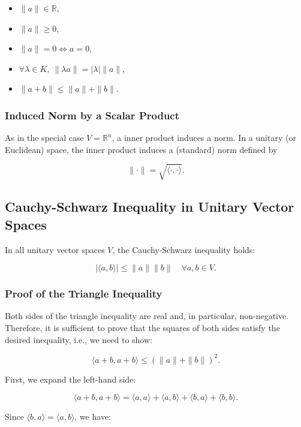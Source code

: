 \begin{itemize}[label=\(-\)]
    \item \( \|a\| \in \mathbb{R} \),
    \item \( \|a\| \geq 0 \),
    \item \( \|a\| = 0 \iff a = 0 \),
    \item \( \forall \lambda \in K, \ \| \lambda a \| = |\lambda| \| a \| \),
    \item \( \| a + b \| \leq \| a \| + \| b \| \).
\end{itemize}

\subsubsection{Induced Norm by a Scalar Product}

As in the special case \( V = \mathbb{R}^n \), a inner product induces a norm.
In a unitary (or Euclidean) space, the inner product induces a (standard) norm defined by

\[
\| \cdot \| = \sqrt{\langle \cdot, \cdot \rangle}.
\]

\subsection{Cauchy-Schwarz Inequality in Unitary Vector Spaces}

In all unitary vector spaces \( V \), the Cauchy-Schwarz inequality holds:

\[
| \langle a, b \rangle | \leq \| a \| \| b \| \quad \forall a, b \in V.
\]

\subsubsection{Proof of the Triangle Inequality}

Both sides of the triangle inequality are real and, in particular, non-negative. 
Therefore, it is sufficient to prove that the squares of both sides satisfy the desired inequality, i.e., we need to show:

\[
\langle a + b, a + b \rangle \leq {(\|a\| + \|b\|)}^2.
\]

First, we expand the left-hand side:

\[
\langle a + b, a + b \rangle = \langle a, a \rangle + \langle a, b \rangle + \langle b, a \rangle + \langle b, b \rangle.
\]

Since \( \langle b, a \rangle = \langle a, b \rangle \), we have:

